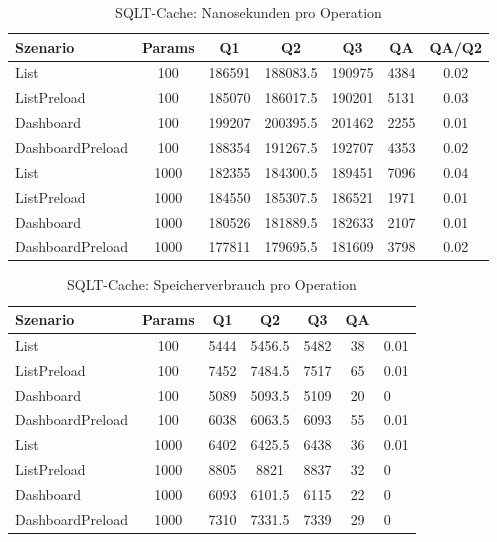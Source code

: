 
\begin{table}[ht]
\centering
\caption{SQLT-Cache: Nanosekunden pro Operation}
\begin{tabular}{lcccccc}
\toprule
Szenario & Params & Q1 & Q2 & Q3 & QA & QA/Q2 \\
\midrule
	List & 100 & 186591 & 188083.5 & 190975 & 4384 & 0.02 \\
	ListPreload & 100 & 185070 & 186017.5 & 190201 & 5131 & 0.03 \\
	Dashboard & 100 & 199207 & 200395.5 & 201462 & 2255 & 0.01 \\
	DashboardPreload & 100 & 188354 & 191267.5 & 192707 & 4353 & 0.02 \\
	List & 1000 & 182355 & 184300.5 & 189451 & 7096 & 0.04 \\
	ListPreload & 1000 & 184550 & 185307.5 & 186521 & 1971 & 0.01 \\
	Dashboard & 1000 & 180526 & 181889.5 & 182633 & 2107 & 0.01 \\
	DashboardPreload & 1000 & 177811 & 179695.5 & 181609 & 3798 & 0.02 \\
\bottomrule
\end{tabular}
\label{tab:benchmark_sqlt-cache_nsperop}
\end{table}
	
\begin{table}[ht]
\centering
\caption{SQLT-Cache: Speicherverbrauch pro Operation}
\begin{tabular}{lccccc}
\toprule
Szenario & Params & Q1 & Q2 & Q3 & QA \\
\midrule
	List & 100 & 5444 & 5456.5 & 5482 & 38 & 0.01 \\
	ListPreload & 100 & 7452 & 7484.5 & 7517 & 65 & 0.01 \\
	Dashboard & 100 & 5089 & 5093.5 & 5109 & 20 & 0 \\
	DashboardPreload & 100 & 6038 & 6063.5 & 6093 & 55 & 0.01 \\
	List & 1000 & 6402 & 6425.5 & 6438 & 36 & 0.01 \\
	ListPreload & 1000 & 8805 & 8821 & 8837 & 32 & 0 \\
	Dashboard & 1000 & 6093 & 6101.5 & 6115 & 22 & 0 \\
	DashboardPreload & 1000 & 7310 & 7331.5 & 7339 & 29 & 0 \\
\bottomrule
\end{tabular}
\label{tab:benchmark_sqlt-cache_bytesperop}
\end{table}
	
